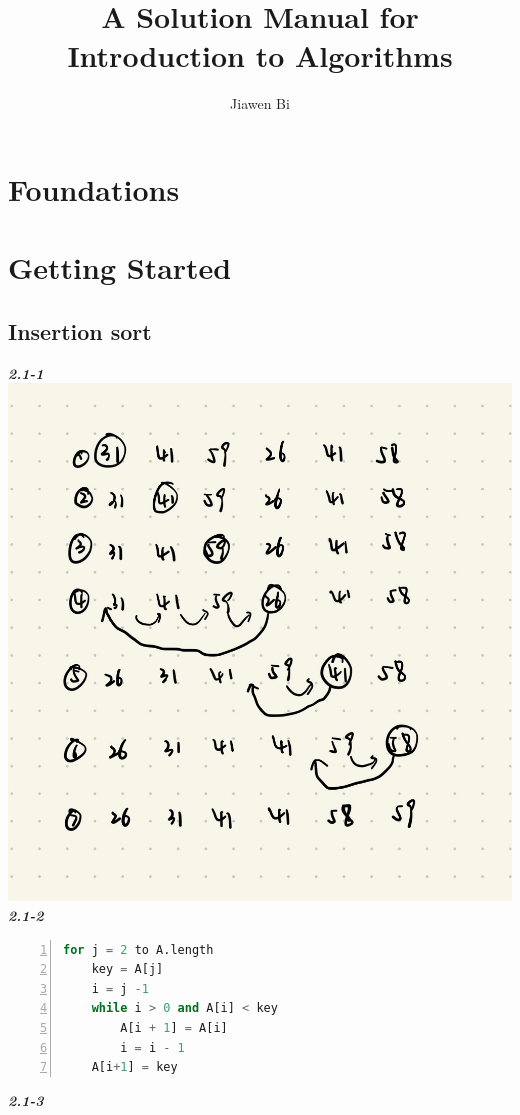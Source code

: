 \documentclass[Unicode]{article}
\title{A Solution Manual for Introduction to Algorithms}
\author{Jiawen Bi}
\begin{document}
\maketitle
\tableofcontents

\section{Foundations}

\section{Getting Started}
\subsection{Insertion sort}
\textbf{\textit{\Large{2.1-1}}}\\
\includegraphics[scale=0.2]{c.jpeg}\\
\textbf{\textit{\Large{2.1-2}}}
\begin{lstlisting}[language=Python,numbers=left,numberstyle=\normalsize]
for j = 2 to A.length
    key = A[j]
    i = j -1 
    while i > 0 and A[i] < key
        A[i + 1] = A[i]
        i = i - 1
    A[i+1] = key
\end{lstlisting}
\textbf{\textit{\Large{2.1-3}}}
\end{document}

